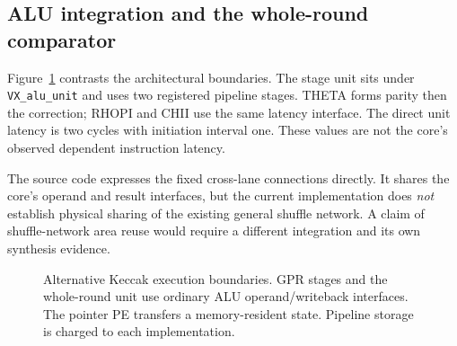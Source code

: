\documentclass[conference,letterpaper]{IEEEtran}
\newcommand{\code}[1]{\texttt{#1}}
\begin{document}
\subsection{ALU integration and the whole-round comparator}
Figure~\ref{fig:architecture} contrasts the architectural boundaries.
The stage unit sits under \code{VX\_alu\_unit} and uses two registered
pipeline stages. THETA forms parity then the correction; RHOPI and CHII
use the same latency interface. The direct unit latency is two cycles
with initiation interval one. These values are not the core's observed
dependent instruction latency.

The source code expresses the fixed cross-lane connections directly.
It shares the core's operand and result interfaces, but the current
implementation does \emph{not} establish physical sharing of the existing
general shuffle network. A claim of shuffle-network area reuse would
require a different integration and its own synthesis evidence.

\begin{figure}[t]
\centering
{}
\caption{Alternative Keccak execution boundaries. GPR stages and the whole-round
unit use ordinary ALU operand/writeback interfaces. The pointer PE transfers a
memory-resident state. Pipeline storage is charged to each implementation.}
\label{fig:architecture}
\end{figure}
\end{document}
